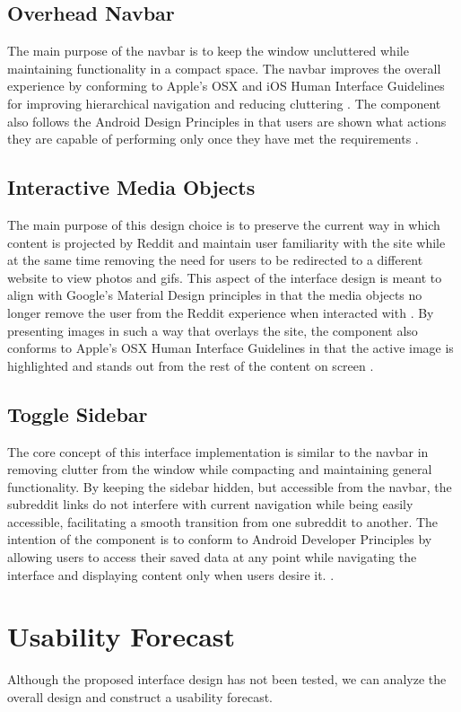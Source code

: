 \documentclass{article}
\begin{document}
\subsection{Overhead Navbar} The main purpose of the navbar is to keep the window uncluttered while maintaining functionality in a compact space. The navbar improves the overall experience by conforming to Apple's OSX and iOS Human Interface Guidelines for improving hierarchical navigation and reducing cluttering \cite{OSX, iOS}. The component also follows the Android Design Principles in that users are shown what actions they are capable of performing only once they have met the requirements \cite{Android}.

\subsection{Interactive Media Objects} The main purpose of this design choice is to preserve the current way in which content is projected by Reddit and maintain user familiarity with the site while at the same time removing the need for users to be redirected to a different website to view photos and gifs. This aspect of the interface design is meant to align with Google's Material Design principles in that the media objects no longer remove the user from the Reddit experience when interacted with \cite{Google}. By presenting images in such a way that overlays the site, the component also conforms to Apple's OSX Human Interface Guidelines in that the active image is highlighted and stands out from the rest of the content on screen \cite{OSX}.

\subsection{Toggle Sidebar} The core concept of this interface implementation is similar to the navbar in removing clutter from the window while compacting and maintaining general functionality. By keeping the sidebar hidden, but accessible from the navbar, the subreddit links do not interfere with current navigation while being easily accessible, facilitating a smooth transition from one subreddit to another. The intention of the component is to conform to Android Developer Principles by allowing users to access their saved data at any point while navigating the interface and displaying content only when users desire it. \cite{Android}.

\section{Usability Forecast} Although the proposed interface design has not been tested, we can analyze the overall design and construct a usability forecast.
\end{document}
